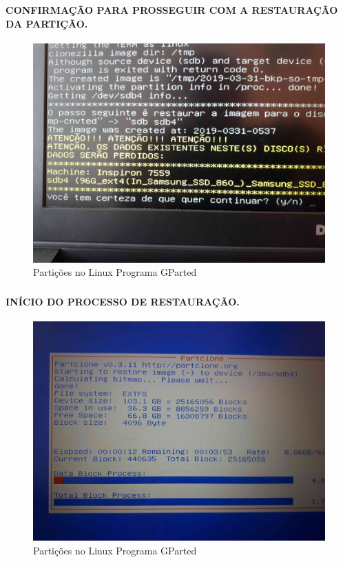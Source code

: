 \documentclass{beamer}
\begin{document}
\begin{frame}[plain,c]
   \frametitle{\insertsection}
    \framesubtitle{CONFIRMAÇÃO PARA PROSSEGUIR COM A RESTAURAÇÃO DA PARTIÇÃO.}
    \begin{figure}[!h]
        \includegraphics[width=1\linewidth]{images/rest/res19.jpg}
        \caption{Partições no Linux Programa GParted}
    \end{figure}
\end{frame}

\begin{frame}[plain,c]
   \frametitle{\insertsection}
    \framesubtitle{INÍCIO DO PROCESSO DE RESTAURAÇÃO.}
    \begin{figure}[!h]
        \includegraphics[width=1\linewidth]{images/rest/res20.jpg}
        \caption{Partições no Linux Programa GParted}
    \end{figure}
\end{frame}
\end{document}
